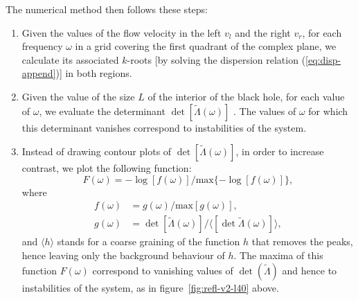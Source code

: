 \documentclass[11pt,a4paper]{article}
\begin{document}
The numerical method then follows these steps:

\begin{enumerate}
\item Given the values of the flow velocity in the left $v_l$ and the right $v_r$, for each frequency $\omega$ in a grid covering the first quadrant
of the complex plane, we calculate its
associated $k$-roots [by solving the dispersion relation
(\ref{eq:disp-append})] in both regions.
\item Given the value of the size $L$ of the interior of the  black hole, for each value of $\omega$, we evaluate the determinant $\det[\tilde\Lambda(\omega)]$ . The values of $\omega$ for which this determinant vanishes correspond to instabilities of the system.

\item Instead of drawing contour plots of $\det[\tilde\Lambda(\omega)]$, in order to increase contrast, we plot the following function:
\begin{equation}
F(\omega)=-\log[f(\omega)]/\text{max}\{-\log[f(\omega)]\},
\end{equation}
where
\begin{align}
f(\omega)&= g(\omega)/\text{max}[g(\omega)],
\nonumber\\
g(\omega)&=
\det[\tilde\Lambda(\omega)]/\langle[\det\tilde\Lambda(\omega)]\rangle,
\end{align}
and $\langle h\rangle$ stands for a coarse graining of the function $h$ that removes the peaks, hence leaving only the background behaviour of $h$.  The maxima of this function $F(\omega)$ correspond to vanishing values of $\det(\tilde \Lambda)$ and hence to instabilities  of the system, as in figure~\ref{fig:refl-v2-l40} above.
\end{enumerate}
\end{document}

